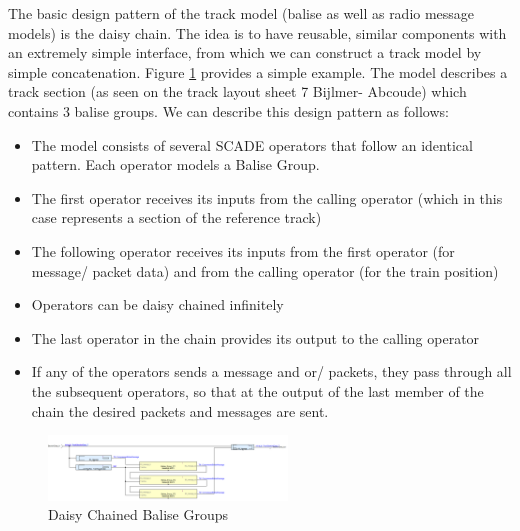\documentclass{template/openetcs_article}
\begin{document}
The basic design pattern of the track model (balise as well as radio message models) is the daisy chain. The idea is to have reusable, similar components with an extremely simple interface, from which we can construct a track model by simple concatenation. Figure \ref{fig:daisy} provides a simple example. The model describes a track section (as seen on the track layout sheet  7 Bijlmer- Abcoude) which contains 3 balise groups.\newline
We can describe this design pattern as follows:
\begin{itemize}
 \item The model consists of several SCADE operators that follow an identical pattern. Each operator models a Balise Group.
 \item The first operator receives its inputs from the calling operator (which in this case represents a section of the reference track)
 \item The following operator receives its inputs from the first operator (for message/ packet data) and from the calling operator (for the train position)
 \item Operators can be daisy chained infinitely
 \item The last operator in the chain provides its output to the calling operator
 \item If any of the operators sends a message and or/ packets, they pass through all the subsequent operators, so that at the output of the last member of the chain the desired packets and messages are sent.
\end{itemize}

\begin{figure}
  \centering
  \includegraphics[angle=90, origin=c,width=2.5in]{images/DaisyChain}
  \caption{Daisy Chained Balise Groups}
  \label{fig:daisy}
\end{figure}
\end{document}
